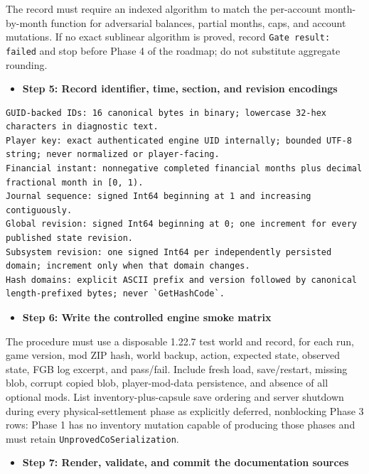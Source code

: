 \documentclass[
  10pt,
  letterpaper,
]{article}
\newcommand{\passthrough}[1]{#1}
\providecommand{\tightlist}{%
  \setlength{\itemsep}{0pt}\setlength{\parskip}{0pt}}
\begin{document}
The record must require an indexed algorithm to match the per-account
month-by-month function for adversarial balances, partial months, caps,
and account mutations. If no exact sublinear algorithm is proved, record
\passthrough{\lstinline!Gate result: failed!} and stop before Phase 4 of
the roadmap; do not substitute aggregate rounding.

\begin{itemize}
\tightlist
\item[$\square$]
  \textbf{Step 5: Record identifier, time, section, and revision
  encodings}
\end{itemize}

\begin{lstlisting}
GUID-backed IDs: 16 canonical bytes in binary; lowercase 32-hex characters in diagnostic text.
Player key: exact authenticated engine UID internally; bounded UTF-8 string; never normalized or player-facing.
Financial instant: nonnegative completed financial months plus decimal fractional month in [0, 1).
Journal sequence: signed Int64 beginning at 1 and increasing contiguously.
Global revision: signed Int64 beginning at 0; one increment for every published state revision.
Subsystem revision: one signed Int64 per independently persisted domain; increment only when that domain changes.
Hash domains: explicit ASCII prefix and version followed by canonical length-prefixed bytes; never `GetHashCode`.
\end{lstlisting}

\begin{itemize}
\tightlist
\item[$\square$]
  \textbf{Step 6: Write the controlled engine smoke matrix}
\end{itemize}

The procedure must use a disposable 1.22.7 test world and record, for
each run, game version, mod ZIP hash, world backup, action, expected
state, observed state, FGB log excerpt, and pass/fail. Include fresh
load, save/restart, missing blob, corrupt copied blob, player-mod-data
persistence, and absence of all optional mods. List
inventory-plus-capsule save ordering and server shutdown during every
physical-settlement phase as explicitly deferred, nonblocking Phase 3
rows: Phase 1 has no inventory mutation capable of producing those
phases and must retain
\passthrough{\lstinline!UnprovedCoSerialization!}.

\begin{itemize}
\tightlist
\item[$\square$]
  \textbf{Step 7: Render, validate, and commit the documentation
  sources}
\end{itemize}
\end{document}
